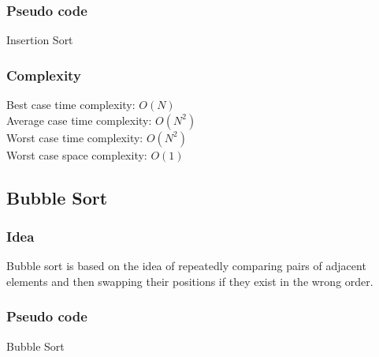 \documentclass[11pt,a4paper]{article}
\begin{document}
\subsubsection*{Pseudo code}
\begin{algorithm2e}
  \SetAlgoLined
  \caption{Insertion Sort}
\end{algorithm2e}
\newpage
\subsubsection*{Complexity}
Best case time complexity: $O(N)$ \\
Average case time complexity: $O(N^2)$\\
Worst case time complexity: $O(N^2)$ \\
Worst case space complexity: $O(1)$

\subsection{Bubble Sort}
\subsubsection*{Idea}
Bubble sort is based on the idea of repeatedly comparing pairs of adjacent elements and then 
swapping their positions if they exist in the wrong order.

\subsubsection*{Pseudo code}
\begin{algorithm2e}
  \SetAlgoLined
  \caption{Bubble Sort}
\end{algorithm2e}
\end{document}
